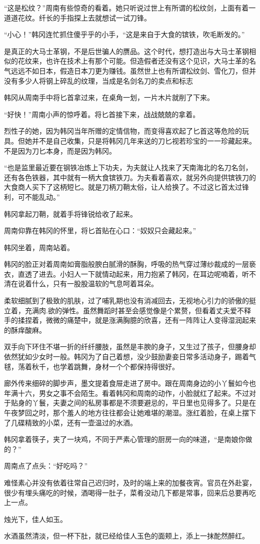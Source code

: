 “这是松纹？”周南有些惊奇的看着。她只听说过世上有所谓的松纹剑，上面有着一道道花纹。纤长的手指探上去就想试一试刀锋。

“小心！”韩冈连忙抓住傻乎乎的小手，“这是来自于大食的镔铁，吹毛断发的。”

是真正的大马士革钢，不是后世骗人的赝品。这个时代，想打造出与大马士革钢相似的花纹来，也许在技术上有那个可能。但造假者还没有这个见识，大马士革的名气远远不如日本，假造日本刀更为赚钱。虽然世上也有所谓松纹剑、雪化刀，但并没有多少人将钢上碎乱的纹理，当成是名剑名刀的卖点和标志

韩冈从周南手中将匕首拿过来，在桌角一划，一片木片就削了下来。

“好快！”周南小声的惊呼着。将匕首接下来，战战兢兢的拿着。

烈性子的她，因为韩冈当年所赠的定情信物，而变得喜欢起了匕首这等危险的玩具。但她并不是自己收集，只是将韩冈几年来送的刀匕视若珍宝的一一珍藏起来。不是因为刀匕本身，而是因为韩冈。

“也是监里最近要在钢铁冶炼上下功夫，为夫就让人找来了天南海北的名刀名剑，还有各色铁器，其中就有一柄大食镔铁刀。为夫看着喜欢，就另外向提供镔铁刀的大食商人买下了这柄短匕。就是刀柄刀鞘太俗，让人给换了。不过这匕首太过锋利，可不能乱动。”

韩冈拿起刀鞘，就着手将锋锐给收了起来。

周南仰靠在韩冈的怀里，将匕首贴在心口：“奴奴只会藏起来。”

韩冈坐着，周南站着。

韩冈的脸正对着周南如膏脂般腴白腻滑的酥胸，呼吸的热气穿过薄纱裁成的一层亵衣，直透了进去。小妇人一下就情动起来，用力抱紧了韩冈，在耳边呢喃着，听不清在说着什么，只有一股股温软的气息呵着耳朵。

柔软细腻到了极致的肌肤，过了哺乳期也没有消减回去，无视地心引力的骄傲的挺立着，充满肉.欲的弹性。虽然舞蹈时甚至会感觉像是个累赘，但看着丈夫爱不释手的揉捏着，微微的痛楚中，就是涨满胸臆的欣喜，还有一阵阵让人变得湿润起来的酥痒酸麻。

双手向下环住不堪一折的纤纤腰肢，虽然是丰腴的身子，又生过了孩子，但腰身却依然犹如少女时一般。韩冈为了自己着想，没少鼓励妻妾日常多活动身子，踢着气毬，荡着秋千，也学着跳舞，身材一个个都保持得很好。

廊外传来细碎的脚步声，墨文提着食屉走进了房中。跟在周南身边的小丫鬟如今也年满十六，男女之事不会陌生。看着韩冈和周南的动作，小脸就红了起来。不过对于贴身的丫鬟，夫妻之间的私房事都是不须要避忌的，平日里也见得多了。只是在午夜梦回之时，那个羞人的地方往往都会让她难堪的潮湿。涨红着脸，在桌上摆下了几碟精致的小菜，还有一壶温过的水酒。

韩冈拿着筷子，夹了一块鸡，不同于严素心管理的厨房一向的味道，“是南娘你做的？”

周南点了点头：“好吃吗？”

难怪素心并没有依着往常自己迟归时，及时的端上来的加餐夜宵。官员在外赴宴，很少有埋头痛吃的时候，酒喝得一肚子，菜肴没动几下都是常事，回来后总要再吃上一点。

烛光下，佳人如玉。

水酒虽然清淡，但一杯下肚，就已经给佳人玉色的面颊上，添上一抹酡然醉红。

